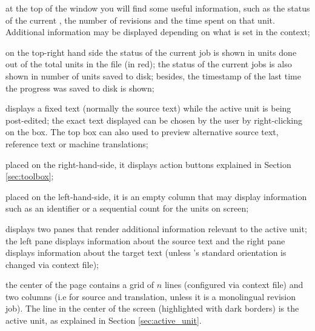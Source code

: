 \begin{description}
	\setlength\itemindent{0.5cm}  
	\item[\tt Labels (1/light blue)] at the top of the window you will find some useful information, such as the status of the current , the number of revisions and the time spent on that unit. Additional information may be displayed depending on what is set in the context;
	\item[\tt Progress (2/green)] on the top-right hand side the status of the current job is shown in units done out of the total units in the file (in red); the status of the current jobs is also shown in number of units saved to disk; besides, the timestamp of the last time the progress was saved to disk is shown;
	\item[\tt Top box (3/orange)] displays a fixed text (normally the source text) while the active unit is being post-edited; the exact text displayed can be chosen by the user by right-clicking on the box. The top box can also used to preview alternative source text, reference text or machine translations;
	\item[\tt Tool box (4/red)] placed on the right-hand-side, it displays action buttons explained in Section \ref{sec:toolbox};
	\item[\tt Id box (5/purple)] placed on the left-hand-side, it is an empty column that may display information such as an identifier or a sequential count for the units on screen;
	\item[\tt Bottom box (6/blue)] displays two panes that render additional information relevant to the active unit; the left pane displays information about the source text and the right pane displays information about the target text (unless \PET's standard orientation is changed via context file);
	\item[\tt Units] the center of the page contains a grid of $n$ lines (configured via context file) and two columns (i.e for source and translation, unless it is a monolingual revision job). The line in the center of the screen (highlighted with dark borders) is the active unit, as explained in Section \ref{sec:active_unit}.
\end{description}

